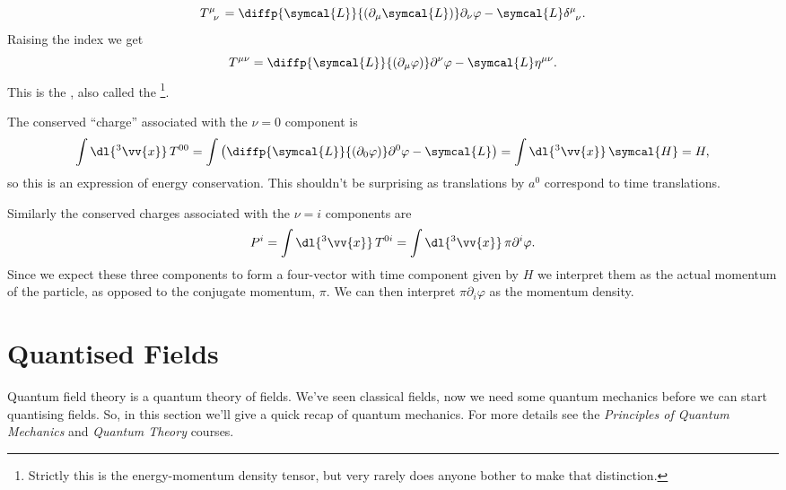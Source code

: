 \documentclass[fleqn]{NotesClass}
\newcommand*{\course}[1]{\textit{#1}}
\newcommand{\minkowskiMetric}{\eta}
\newcommand{\lagrangianDensity}{\symcal{L}}
\newcommand{\hamiltonianDensity}{\symcal{H}}
\begin{document}
    \begin{equation}
        \tensor{T}{^\mu_\nu} = \diffp{\lagrangianDensity}{(\partial_\mu \lagrangianDensity)}\partial_\nu \varphi - \lagrangianDensity \tensor{\delta}{^\mu_\nu}.
    \end{equation}
    Raising the index we get
    \begin{equation}
        T^{\mu\nu} = \diffp{\lagrangianDensity}{(\partial_\mu \varphi)}\partial^\nu \varphi - \lagrangianDensity \minkowskiMetric^{\mu\nu}.
    \end{equation}
    This is the , also called the \footnote{Strictly this is the energy-momentum density tensor, but very rarely does anyone bother to make that distinction.}.
    
    The conserved \enquote{charge} associated with the \(\nu = 0\) component is
    \begin{equation}
        \int \dl{^3\vv{x}} \, T^{00} = \int \left( \diffp{\lagrangianDensity}{(\partial_0\varphi)} \partial^0\varphi - \lagrangianDensity \right) = \int \dl{^3\vv{x}} \, \hamiltonianDensity = H,
    \end{equation}
    so this is an expression of energy conservation.
    This shouldn't be surprising as translations by \(a^0\) correspond to time translations.
    
    Similarly the conserved charges associated with the \(\nu = i\) components are
    \begin{equation}
        P^i = \int \dl{^3\vv{x}} \, T^{0i} = \int \dl{^3\vv{x}} \, \pi \partial^i \varphi.
    \end{equation}
    Since we expect these three components to form a four-vector with time component given by \(H\) we interpret them as the actual momentum of the particle, as opposed to the conjugate momentum, \(\pi\).
    We can then interpret \(\pi\partial_i\varphi\) as the momentum density.
    
    \chapter{Quantised Fields}
    Quantum field theory is a quantum theory of fields.
    We've seen classical fields, now we need some quantum mechanics before we can start quantising fields.
    So, in this section we'll give a quick recap of quantum mechanics.
    For more details see the \course{Principles of Quantum Mechanics} and \course{Quantum Theory} courses.
    
\end{document}
